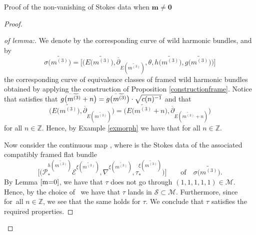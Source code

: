 \begin{subsubsection}{Proof of the non-vanishing of Stokes data when $\boldsymbol{m\neq 0}$}
\begin{proof}
\begin{proof}[of lemma:]
We denote by  the corresponding curve of wild harmonic bundles, and by
\begin{equation*}
 \sigma\bigl(\widetilde{m^{(3)}}\bigr)=\bigl[\bigl(E\bigl(\widetilde{m^{(3)}}\bigr),\overline{\partial}_{E(\widetilde{m^{(3)}})},\theta,h\bigl(\widetilde{m^{(3)}}\bigr),g\bigl(\widetilde{m^{(3)}}\bigr)\bigr)\bigr]
\end{equation*}
the corresponding curve of equivalence classes of framed wild harmonic bundles obtained by applying the construction of Proposition \ref{constructionframe}. Notice that  satisfies that $\smash{g\bigl(\widetilde{m^{(3)}}+n\bigr)}=\smash{g\bigl(\widetilde{m^{(3)}}\bigr)\cdot \sqrt{c(n)^{-1}}}$ and that \[\bigl(E\bigl(\widetilde{m^{(3)}}\bigr),\overline{\partial}_{E(\widetilde{m^{(3)}})}\bigr)
=\bigl(E\bigl(\widetilde{m^{(3)}}+n\bigr),\overline{\partial}_{E(\widetilde{m^{(3)}}+n)}\bigr)
\]
 for all $n \in \mathbb{Z}$. Hence, by Example \ref{exmorph} we have that  for all $n \in \mathbb{Z}$.

Now consider the continuous map , where  is the Stokes data of the associated compatibly framed flat bundle
\[
\bigl[\bigl(\mathcal{P}^{h(\widetilde{m^{(3)}})}_*\mathcal{E}^{\xi(\widetilde{m^{(3)}})},\nabla^{\xi(\widetilde{m^{(3)}})},
\tau_*^{\xi(\widetilde{m^{(3)}})}\bigr)\bigr] \qquad \text{of} \quad \sigma\bigl(\widetilde{m^{(3)}}\bigr).
\]
By Lemma $\ref{m=0}$, we have that $\tau$ does not go through $(1,1,1,1,1) \in \mathcal{M}$. Hence, by the choice of~ we have that $\tau$ lands in $\mathcal{S}\subset \mathcal{M}$. Furthermore, since  for~all ${n \in \mathbb{Z}}$, we see that the same holds for $\tau$. We conclude that $\tau$ satisfies the required properties.
\end{proof}


\end{proof}
\end{subsubsection}
